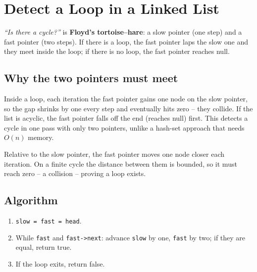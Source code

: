 \section{Detect a Loop in a Linked List}
\label{sec:ll-detect-loop}


\begin{patternbox}
\emph{``Is there a cycle?''} is \textbf{Floyd's tortoise--hare}: a slow
pointer (one step) and a fast pointer (two steps). If there is a loop, the
fast pointer laps the slow one and they meet inside the loop; if there is no
loop, the fast pointer reaches null.
\end{patternbox}

\subsection*{Why the two pointers must meet}

Inside a loop, each iteration the fast pointer gains one node on the slow
pointer, so the gap shrinks by one every step and eventually hits zero --
they collide. If the list is acyclic, the fast pointer falls off the end
(reaches null) first. This detects a cycle in one pass with only two
pointers, unlike a hash-set approach that needs $O(n)$ memory.

\begin{ideabox}
Relative to the slow pointer, the fast pointer moves one node closer each
iteration. On a finite cycle the distance between them is bounded, so it
must reach zero -- a collision -- proving a loop exists.
\end{ideabox}

\subsection*{Algorithm}

\begin{enumerate}
  \item \texttt{slow = fast = head}.
  \item While \texttt{fast} and \texttt{fast->next}: advance \texttt{slow}
        by one, \texttt{fast} by two; if they are equal, return true.
  \item If the loop exits, return false.
\end{enumerate}

